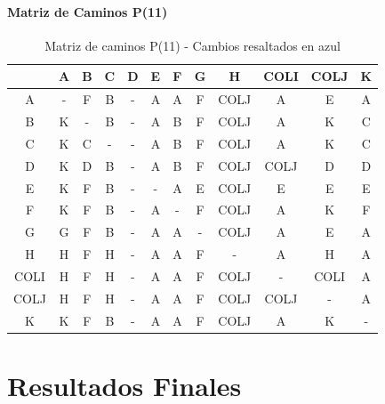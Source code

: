 \documentclass[12pt]{article}
\begin{document}
\paragraph{Matriz de Caminos P(11)}
\begin{table}[h!]
\centering
\begin{tabular}{|c|c|c|c|c|c|c|c|c|c|c|c|}
\hline
 & A & B & C & D & E & F & G & H & COLI & COLJ & K \\\hline
A & - & F & B & - & A & A & F & COLJ & A & E & A \\\hline
B & \cellcolor{lightblue} K & - & B & - & A & B & F & COLJ & A & \cellcolor{lightblue} K & C \\\hline
C & \cellcolor{lightblue} K & C & - & - & \cellcolor{lightblue} A & B & F & COLJ & \cellcolor{lightblue} A & \cellcolor{lightblue} K & C \\\hline
D & \cellcolor{lightblue} K & D & B & - & \cellcolor{lightblue} A & B & F & COLJ & COLJ & D & D \\\hline
E & \cellcolor{lightblue} K & F & B & - & - & A & E & COLJ & E & E & E \\\hline
F & \cellcolor{lightblue} K & F & B & - & A & - & F & COLJ & A & \cellcolor{lightblue} K & F \\\hline
G & G & F & B & - & A & A & - & COLJ & A & E & A \\\hline
H & H & F & H & - & A & A & F & - & A & H & A \\\hline
COLI & H & F & H & - & A & A & F & COLJ & - & COLI & A \\\hline
COLJ & H & F & H & - & A & A & F & COLJ & COLJ & - & A \\\hline
K & K & F & B & - & A & A & F & COLJ & A & K & - \\\hline
\end{tabular}
\caption{Matriz de caminos P(11) - Cambios resaltados en azul}
\end{table}

\clearpage
\section{Resultados Finales}
\end{document}
